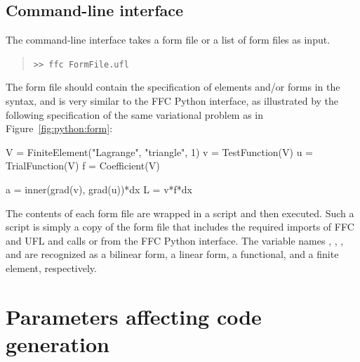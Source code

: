 \subsection{Command-line interface}

The command-line interface takes a \ufl{} form file or a list of form
files as input.
\begin{quote}
\texttt{>> ffc FormFile.ufl}
\end{quote}
The form file should contain the specification of elements and/or
forms in the~\ufl{} syntax, and is very similar to the FFC Python
interface, as illustrated by the following specification of the same
variational problem as in Figure~\ref{fig:python:form}:
\begin{python}
V = FiniteElement("Lagrange", "triangle", 1)
v = TestFunction(V)
u = TrialFunction(V)
f = Coefficient(V)

a = inner(grad(v), grad(u))*dx
L = v*f*dx
\end{python}
The contents of each form file are wrapped in a \pythonlang{} script
and then executed. Such a script is simply a copy of the form file
that includes the required imports of FFC and UFL and calls
 or  from the FFC
Python interface. The variable names , ,
, and  are recognized as a bilinear form,
a linear form, a functional, and a finite element, respectively.

\section{Parameters affecting code generation}

